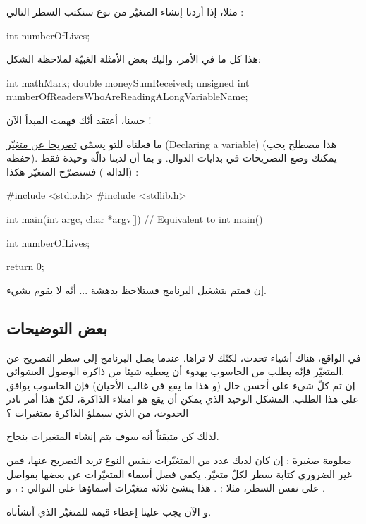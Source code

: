  مثلا، إذا أردنا إنشاء المتغيّر
 من نوع
سنكتب السطر التالي :
\begin{Csource}
int numberOfLives;
\end{Csource}

هذا كل ما في الأمر، وإليك بعض الأمثلة الغبيّة لملاحظة الشكل:
\begin{Csource}
int mathMark;
double moneySumReceived;
unsigned int numberOfReadersWhoAreReadingALongVariableName;
\end{Csource}
حسنا، أعتقد أنّك فهمت المبدأ الآن !

ما فعلناه للتو يسمّى
\underline{تصريحا عن متغيّر}
(\textenglish{Declaring a variable})
(هذا مصطلح يجب حفظه). يمكنك وضع التصريحات في بدايات الدوال. و بما أن لدينا دالّة وحيدة فقط
(الدالة
)
فسنصرّح المتغيّر هكذا :
\begin{Csource}
#include <stdio.h>
#include <stdlib.h>

int main(int argc, char *argv[]) // Equivalent to int main()
{
  int numberOfLives;

  return 0;
}
\end{Csource}
إن قمتم بتشغيل البرنامج فستلاحظ بدهشة ... أنّه لا يقوم بشيء.

\subsection{بعض التوضيحات}
في الواقع، هناك أشياء تحدث، لكنّك لا تراها. عندما يصل البرنامج إلى سطر التصريح عن المتغيّر فإنّه يطلب من الحاسوب بهدوء أن يعطيه شيئا من ذاكرة الوصول العشوائي.\\
إن تم كلّ شيء على أحسن حال (و هذا ما يقع في غالب الأحيان) فإن الحاسوب يوافق على هذا الطلب.
المشكل الوحيد الذي يمكن أن يقع هو امتلاء الذاكرة، لكنّ هذا أمر نادر الحدوث، من الذي سيملؤ الذاكرة بمتغيرات
 ؟

لذلك كن متيقناً أنه سوف يتم إنشاء المتغيرات بنجاح.

\begin{information}
  معلومة صغيرة : إن كان لديك عدد من المتغيّرات بنفس النوع تريد التصريح عنها، فمن غير الضروري كتابة سطر لكلّ متغيّر. يكفي فصل أسماء المتغيّرات عن بعضها بفواصل على نفس السطر، مثلا :
.
هذا ينشئ ثلاثة متغيّرات أسماؤها على التوالي :
، 
و
.
\end{information}

و الآن يجب علينا إعطاء قيمة للمتغيّر الذي أنشأناه.

